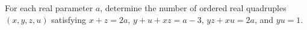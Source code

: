 For each real parameter $a$, determine the number of ordered real quadruples $(x,y,z,u)$ satisfying $x+z=2a$, $y+u+xz=a-3$, $yz+xu=2a$, and $yu=1$.

